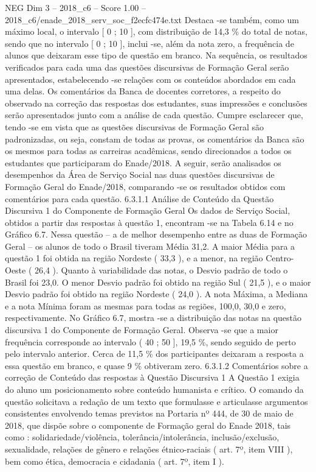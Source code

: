 \begin{textsample}{NEG Dim 3 – 2018\_c6 – Score 1.00 – 2018\_c6/enade\_2018\_serv\_soc\_f2ecfc474e.txt}
Destaca -se também, como um máximo local, o intervalo [ 0 ; 10 ], com distribuição de 14,3 \% do total de notas, sendo que no intervalo [ 0 ; 10 ], inclui -se, além da nota zero, a frequência de alunos que deixaram esse tipo de questão em branco.
Na sequência, os resultados verificados para cada uma das questões discursivas de Formação Geral serão apresentados, estabelecendo -se relações com os conteúdos abordados em cada uma delas.
Os comentários da Banca de docentes corretores, a respeito do observado na correção das respostas dos estudantes, suas impressões e conclusões serão apresentados junto com a análise de cada questão.
Cumpre esclarecer que, tendo -se em vista que as questões discursivas de Formação Geral são padronizadas, ou seja, constam de todas as provas, os comentários da Banca são os mesmos para todas as carreiras acadêmicas, sendo direcionados a todos os estudantes que participaram do Enade/2018.
A seguir, serão analisados os desempenhos da Área de Serviço Social nas duas questões discursivas de Formação Geral do Enade/2018, comparando -se os resultados obtidos com comentários para cada questão. 6.3.1.1 Análise de Conteúdo da Questão Discursiva 1 do Componente de Formação Geral Os dados de Serviço Social, obtidos a partir das respostas à questão 1, encontram -se na Tabela 6.14 e no Gráfico 6.7.
Nessa questão – a de melhor desempenho entre as duas de Formação Geral – os alunos de todo o Brasil tiveram Média 31,2.
A maior Média para a questão 1 foi obtida na região Nordeste ( 33,3 ), e a menor, na região Centro-Oeste ( 26,4 ).
Quanto à variabilidade das notas, o Desvio padrão de todo o Brasil foi 23,0.
O menor Desvio padrão foi obtido na região Sul ( 21,5 ), e o maior Desvio padrão foi obtido na região Nordeste ( 24,0 ).
A nota Máxima, a Mediana e a nota Mínima foram as mesmas para todas as regiões, 100,0, 30,0 e zero, respectivamente.
No Gráfico 6.7, mostra -se a distribuição das notas na questão discursiva 1 do Componente de Formação Geral.
Observa -se que a maior frequência corresponde ao intervalo ( 40 ; 50 ], 19,5 \%, sendo seguido de perto pelo intervalo anterior.
Cerca de 11,5 \% dos participantes deixaram a resposta a essa questão em branco, e quase 9 \% obtiveram zero. 6.3.1.2 Comentários sobre a correção de Conteúdo das respostas à Questão Discursiva 1 A Questão 1 exigia do aluno um posicionamento sobre conteúdo humanista e crítico.
O comando da questão solicitava a redação de um texto que formulasse e articulasse argumentos consistentes envolvendo temas previstos na Portaria nº 444, de 30 de maio de 2018, que dispõe sobre o componente de Formação geral do Enade 2018, tais como : solidariedade/violência, tolerância/intolerância, inclusão/exclusão, sexualidade, relações de gênero e relações étnico-raciais ( art. 7º, item VIII ), bem como ética, democracia e cidadania ( art. 7º, item I ).

\end{textsample}
